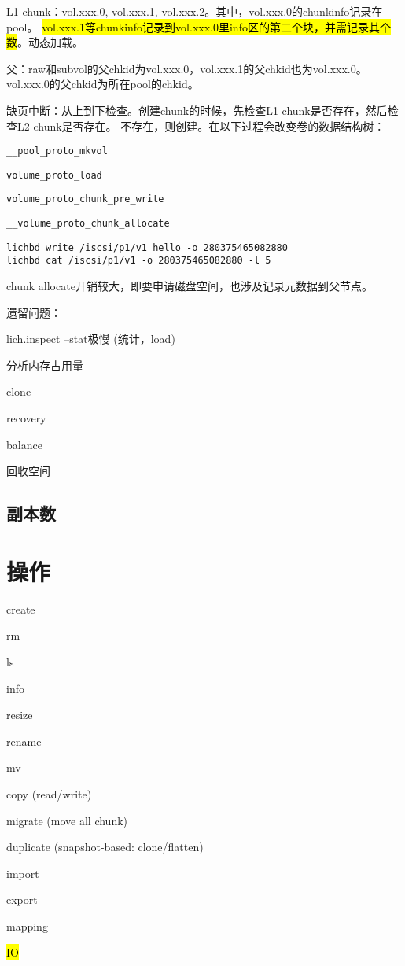 L1 chunk：vol.xxx.0, vol.xxx.1, vol.xxx.2。其中，vol.xxx.0的chunkinfo记录在pool。
\hl{vol.xxx.1等chunkinfo记录到vol.xxx.0里info区的第二个块，并需记录其个数}。动态加载。

父：raw和subvol的父chkid为vol.xxx.0，vol.xxx.1的父chkid也为vol.xxx.0。vol.xxx.0的父chkid为所在pool的chkid。

缺页中断：从上到下检查。创建chunk的时候，先检查L1 chunk是否存在，然后检查L2 chunk是否存在。
不存在，则创建。在以下过程会改变卷的数据结构树：
\begin{compactitem}
\item \verb|__pool_proto_mkvol|
\item \verb|volume_proto_load|
\item \verb|volume_proto_chunk_pre_write|
\item \verb|__volume_proto_chunk_allocate|
\end{compactitem}

\begin{lstlisting}[frame=single]
lichbd write /iscsi/p1/v1 hello -o 280375465082880
lichbd cat /iscsi/p1/v1 -o 280375465082880 -l 5
\end{lstlisting}

chunk allocate开销较大，即要申请磁盘空间，也涉及记录元数据到父节点。

遗留问题：
\begin{enumbox}
\item lich.inspect --stat极慢 (统计，load)
\item 分析内存占用量
\item clone
\item recovery
\item balance
\item 回收空间
\end{enumbox}

\subsection{副本数}

\section{操作}

\begin{enumbox}
\item create
\item rm
\item ls
\item info
\item resize
\item rename
\item mv
\item copy (read/write)
\item migrate (move all chunk)
\item duplicate (snapshot-based: clone/flatten)
\item import
\item export
\item mapping
\item \hl{IO}
\end{enumbox}

